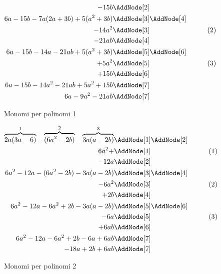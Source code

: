 \begin{figure}
\begin{NodesList}
\begin{align*}
		-15b&\AddNode[2]&\\
		6a-15b-7a(2a+3b)+5(a^2+3b)&\AddNode[3]\AddNode[4]\\
		-14a^2&\AddNode[3]&\tag{2}\\    
		-21ab&\AddNode[4]&\\
		6a-15b-14a-21ab+5(a^2+3b)&\nonumber\AddNode[5]\AddNode[6]\\
		+5a^2&\AddNode[5]&\tag{3}\\
		+15b&\AddNode[6]&\\
		6a-15b-14a^2-21ab+5a^2+15b&\nonumber\AddNode[7]&\\   
		6a-9a^2-21ab&\nonumber\AddNode[7] 
	\end{align*}
\end{NodesList}
	\caption[]{Monomi per polinomi 1}
	\label{fig:monomiperpolinomi1}
\end{figure}

\begin{figure}
\begin{NodesList}
	\begin{align*}
		\overbrace{2a(3a-6)}^{1}-\overbrace{(6a^2-2b)}^{2}-\overbrace{3a(a-2b)}^{3}&\AddNode[1]\AddNode[2]\\
		6a^2+&\AddNode[1]&\tag{1}\\ 
		-12a&\AddNode[2]&\\
		6a^2-12a-(6a^2-2b)-3a(a-2b)&\AddNode[3]\AddNode[4]\\
		-6a^2&\AddNode[3]&\tag{2}\\    
		+2b&\AddNode[4]&\\
		6a^2-12a-6a^2+2b-3a(a-2b)&\AddNode[5]\AddNode[6]\\
		-6a&\AddNode[5]&\tag{3}\\
		+6ab&\AddNode[6]&\\
		6a^2-12a-6a^2+2b-6a+6ab&\AddNode[7]\\   
		-18a+2b+6ab&\AddNode[7]   
	\end{align*}
\end{NodesList}
	\caption[]{Monomi per polinomi 2}
	\label{fig:monomiperpolinomi2}
\end{figure}

